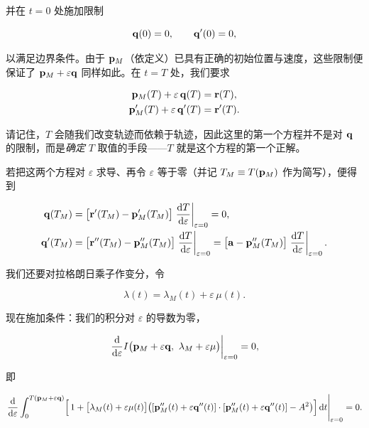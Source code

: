 并在 $t=0$ 处施加限制

\begin{equation}
\mathbf{q}(0)=0,\qquad \mathbf{q}'(0)=0 ,
\end{equation}

以满足边界条件。由于 $\mathbf{p}_M$（依定义）已具有正确的初始位置与速度，这些限制便保证了 $\mathbf{p}_M+\varepsilon\mathbf{q}$ 同样如此。在 $t=T$ 处，我们要求

\begin{align}
\mathbf{p}_M(T)+\varepsilon\,\mathbf{q}(T) &= \mathbf{r}(T), \\
\mathbf{p}_M'(T)+\varepsilon\,\mathbf{q}'(T) &= \mathbf{r}'(T).
\end{align}

请记住，$T$ 会随我们改变轨迹而依赖于轨迹，因此这里的第一个方程并不是对 $\mathbf{q}$ 的限制，而是\emph{确定} $T$ 取值的手段——$T$ 就是这个方程的第一个正解。

若把这两个方程对 $\varepsilon$ 求导、再令 $\varepsilon$ 等于零（并记 $T_M\equiv T(\mathbf{p}_M)$ 作为简写），便得到

\begin{align}
\mathbf{q}(T_M) &= \bigl[\mathbf{r}'(T_M)-\mathbf{p}_M'(T_M)\bigr]\left.\frac{\mathrm{d} T}{\mathrm{d}\varepsilon}\right|_{\varepsilon=0} = 0, \\
\mathbf{q}'(T_M) &= \bigl[\mathbf{r}''(T_M)-\mathbf{p}_M''(T_M)\bigr]\left.\frac{\mathrm{d} T}{\mathrm{d}\varepsilon}\right|_{\varepsilon=0}
= \bigl[\mathbf{a}-\mathbf{p}_M''(T_M)\bigr]\left.\frac{\mathrm{d} T}{\mathrm{d}\varepsilon}\right|_{\varepsilon=0}.
\end{align}

我们还要对拉格朗日乘子作变分，令

\begin{equation}
\lambda(t)=\lambda_M(t)+\varepsilon\,\mu(t).
\end{equation}

现在施加条件：我们的积分对 $\varepsilon$ 的导数为零，

\begin{equation}
\left.\frac{\dd}{\dd\varepsilon} I\bigl(\bp_M+\varepsilon\bq,\ \lambda_M+\varepsilon\mu\bigr)\right|_{\varepsilon=0}=0 ,
\end{equation}

即

\begin{equation}
\left.\frac{\mathrm{d}}{\mathrm{d}\varepsilon}\int_{0}^{T(\mathbf{p}_M+\varepsilon\mathbf{q})}
\Bigl[\,1+\bigl[\lambda_M(t)+\varepsilon\mu(t)\bigr]\bigl([\mathbf{p}_M''(t)+\varepsilon\mathbf{q}''(t)]\cdot[\mathbf{p}_M''(t)+\varepsilon\mathbf{q}''(t)]-A^{2}\bigr)\Bigr]\,\mathrm{d} t\right|_{\varepsilon=0}=0 .
\end{equation}

